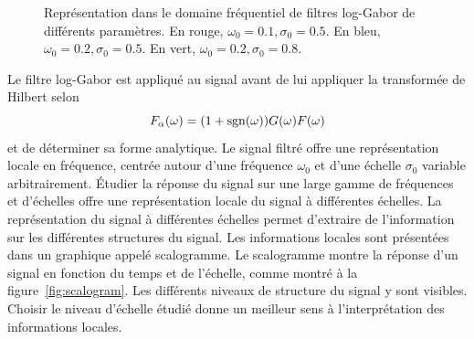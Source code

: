 \begin{figure}
    \centering

    \caption[Filtres log-Gabor]{Représentation dans le domaine fréquentiel de filtres log-Gabor de différents paramètres. En rouge, $\omega_0=0.1, \sigma_0 = 0.5$. En bleu, $\omega_0=0.2, \sigma_0 = 0.5$. En vert, $\omega_0=0.2, \sigma_0 = 0.8$.}
    \label{fig:log-gabor-filters}
\end{figure}

Le filtre log-Gabor est appliqué au signal avant de lui appliquer la transformée de Hilbert selon
\begin{equation}
    F_{\alpha}(\omega) = (1+\operatorname{sgn}(\omega))G(\omega)F(\omega)
\end{equation}
et de déterminer sa forme analytique. Le signal filtré offre une représentation locale en fréquence, centrée autour d'une fréquence $\omega_0$ et d'une échelle $\sigma_0$ variable arbitrairement. Étudier la réponse du signal sur une large gamme de fréquences et d'échelles offre une représentation locale du signal à différentes échelles. La représentation du signal à différentes échelles permet d'extraire de l'information sur les différentes structures du signal. Les informations locales sont présentées dans un graphique appelé scalogramme. Le scalogramme montre la réponse d'un signal en fonction du temps et de l'échelle, comme montré à la figure~\ref{fig:scalogram}. Les différents niveaux de structure du signal y sont visibles. Choisir le niveau d'échelle étudié donne un meilleur sens à l'interprétation des informations locales.

